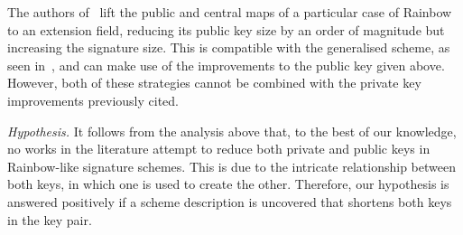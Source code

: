 \documentclass[draft, 12pt, a4paper, oneside]{memoir}
\begin{document}
The authors of~\cite{Szepieniec:201706:inproc} lift the public and central maps
of a particular case of Rainbow to an extension field, reducing its public 
key size by an order of magnitude but increasing the signature size. This is 
compatible with the generalised scheme, as seen in~\cite{Beullens:201706:msc,Beullens:201712:inproc},
and can make use of the improvements to the public key given above. However,
both of these strategies cannot be combined with the private key improvements
previously cited. 

\emph{Hypothesis.} It follows from the analysis above that, to the best of our knowledge, no works in the literature attempt to reduce both private and public keys in Rainbow-like signature schemes. This is due to the intricate relationship between both keys, in which one is used to create the other. Therefore, our hypothesis is answered positively if a scheme description is uncovered that shortens both keys in the key pair.



\end{document}
